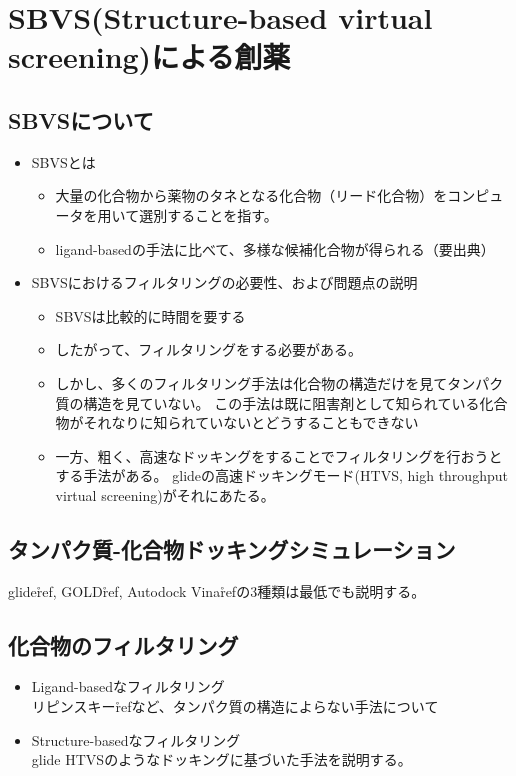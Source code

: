 \chapter{SBVS(Structure-based virtual screening)による創薬}
\section{SBVSについて}
\begin{itemize}
\item SBVSとは
	\begin{itemize}
	\item 大量の化合物から薬物のタネとなる化合物（リード化合物）をコンピュータを用いて選別することを指す。
	\item ligand-basedの手法に比べて、多様な候補化合物が得られる（要出典）
	\end{itemize}
\item SBVSにおけるフィルタリングの必要性、および問題点の説明
	\begin{itemize}
	\item SBVSは比較的に時間を要する
	\item したがって、フィルタリングをする必要がある。
	\item しかし、多くのフィルタリング手法は化合物の構造だけを見てタンパク質の構造を見ていない。
		この手法は既に阻害剤として知られている化合物がそれなりに知られていないとどうすることもできない
	\item 一方、粗く、高速なドッキングをすることでフィルタリングを行おうとする手法がある。
		glideの高速ドッキングモード(HTVS, high throughput virtual screening)がそれにあたる。
	\end{itemize}
\end{itemize}
\section{タンパク質-化合物ドッキングシミュレーション}
glide\r{ref}, GOLD\r{ref}, Autodock Vina\r{ref}の3種類は最低でも説明する。
\section{化合物のフィルタリング}
\begin{itemize}
\item Ligand-basedなフィルタリング\\
	リピンスキー\r{ref}など、タンパク質の構造によらない手法について
\item Structure-basedなフィルタリング\\
	glide HTVSのようなドッキングに基づいた手法を説明する。
\end{itemize}
